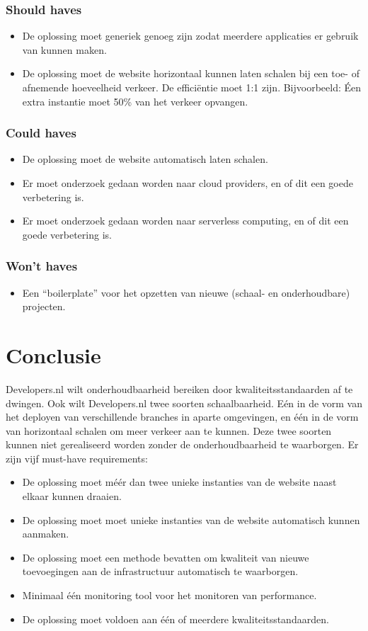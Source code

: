 \subsubsection{Should haves}
\begin{itemize}
	\item De oplossing moet generiek genoeg zijn zodat meerdere applicaties er gebruik van kunnen maken.
	\item De oplossing moet de website horizontaal kunnen laten schalen bij een toe- of afnemende hoeveelheid verkeer. De efficiëntie moet 1:1 zijn. Bijvoorbeeld: Éen extra instantie moet 50\% van het verkeer opvangen.
\end{itemize}

\subsubsection{Could haves}
\begin{itemize}
	\item De oplossing moet de website automatisch laten schalen.
	\item Er moet onderzoek gedaan worden naar cloud providers, en of dit een goede verbetering is.
	\item Er moet onderzoek gedaan worden naar serverless computing, en of dit een goede verbetering is.
\end{itemize}

\subsubsection{Won't haves}
\begin{itemize}
	\item Een \enquote{boilerplate} voor het opzetten van nieuwe (schaal- en onderhoudbare) projecten.
\end{itemize}

\section{Conclusie}
Developers.nl wilt onderhoudbaarheid bereiken door kwaliteitsstandaarden af te dwingen. Ook wilt Developers.nl twee soorten schaalbaarheid. Eén in de vorm van het deployen van verschillende branches in aparte omgevingen, en één in de vorm van horizontaal schalen om meer verkeer aan te kunnen. Deze twee soorten kunnen niet gerealiseerd worden zonder de onderhoudbaarheid te waarborgen. Er zijn vijf must-have requirements:

\begin{itemize}
	\item De oplossing moet méér dan twee unieke instanties van de website naast elkaar kunnen draaien.
	\item De oplossing moet moet unieke instanties van de website automatisch kunnen aanmaken.
	\item De oplossing moet een methode bevatten om kwaliteit van nieuwe toevoegingen aan de infrastructuur automatisch te waarborgen.
	\item Minimaal één monitoring tool voor het monitoren van performance.
	\item De oplossing moet voldoen aan één of meerdere kwaliteitsstandaarden.
\end{itemize}